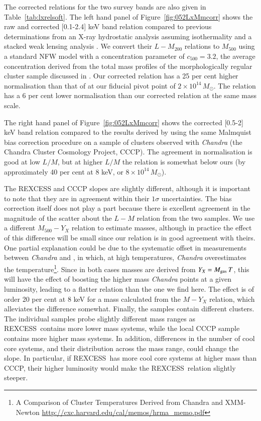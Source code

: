 \documentclass[oldversion]{aa}
\newcommand{\rexcess}{{\gwpfont REXCESS}}
\begin{document}
The corrected relations for the two survey bands are also given in Table~\ref{tab:lxrelsoft}. The left hand panel of Figure~\ref{fig:052LxMmcorr} shows the raw and corrected [0.1-2.4] keV band relation compared to previous determinations from an X-ray hydrostatic analysis assuming isothermality \citep{rb02} and a stacked weak lensing analysis \citep{rykoff08}. We convert their $L-M_{200}$ relations to $M_{500}$ using a standard NFW model with a concentration parameter of $c_{500} = 3.2$, the average concentration derived from the total mass profiles of the morphologically regular cluster sample discussed in \citet{pap05}. Our corrected relation has a 25 per cent higher normalisation than that of \citeauthor{rykoff08} at our fiducial pivot point of $2 \times 10^{14}\, M_\odot$. The \citeauthor{rb02} relation has a 6 per cent lower normalisation than our corrected relation at the same mass scale.

The right hand panel of Figure~\ref{fig:052LxMmcorr} shows the corrected [0.5-2] keV band relation compared to the results derived by \citet{vikh08} using the same Malmquist bias correction procedure on a sample of clusters observed with {\it Chandra} (the Chandra Cluster Cosmology Project, CCCP). The agreement in normalisation is good at low $L/M$, but at higher $L/M$ the \citeauthor{vikh08} relation is somewhat below ours (by approximately 40 per cent at 8 keV, or $8 \times 10^{14}\, M_\odot$). 

The REXCESS and CCCP slopes are slightly different, although it is important to note that they are in agreement within their $1\sigma$ uncertainties. The bias correction itself does not play a part because there is excellent agreement in the magnitude of the scatter about the $L-M$ relation from the two samples. We  use a different $M_{500}-Y_X$ relation to estimate masses, although in practice the effect of this difference will be small since our relation is in good agreement with theirs. One partial explanation could be due to the systematic offset in measurements between {\it Chandra} and \xmm, in which, at high temperatures, {\it Chandra} overestimates the temperature\footnote{A Comparison of Cluster Temperatures Derived from Chandra and XMM-Newton \url{http://cxc.harvard.edu/cal/memos/hrma_memo.pdf}}. Since in both cases masses are derived from $Y_X = M_{\rm gas}\, T$, this will have the effect of boosting the higher mass {\it Chandra} points at a given luminosity, leading to a flatter relation than the one we find here. The effect is of order 20 per cent at 8 keV for a mass calculated from the $M-Y_X$ relation, which alleviates the difference somewhat. Finally, the samples contain different clusters. The individual samples probe slightly different mass ranges as \rexcess\ contains more lower mass systems, while the local CCCP sample contains more higher mass systems. In addition, differences in the number of cool core systems, and their distribution across the mass range, could change the slope. In particular, if \rexcess\ has more cool core systems at higher mass than CCCP, their higher luminosity would make the \rexcess\ relation slightly steeper.
\end{document}
